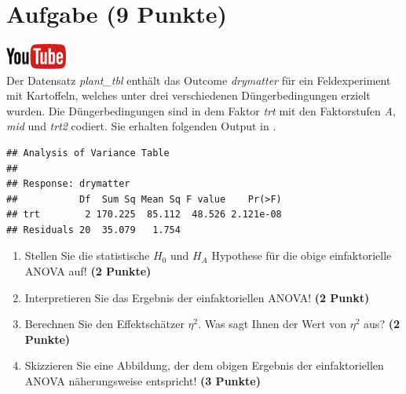 \documentclass[a4paper, 9pt]{scrartcl}\usepackage[]{graphicx}\usepackage[]{xcolor}
\makeatletter
\newenvironment{kframe}{%
 \def\at@end@of@kframe{}%
 \ifinner\ifhmode%
  \def\at@end@of@kframe{\end{minipage}}%
  \begin{minipage}{\columnwidth}%
 \fi\fi%
 \def\FrameCommand##1{\hskip\@totalleftmargin \hskip-\fboxsep
 \colorbox{shadecolor}{##1}\hskip-\fboxsep
     \hskip-\linewidth \hskip-\@totalleftmargin \hskip\columnwidth}%
 \MakeFramed {\advance\hsize-\width
   \@totalleftmargin\z@ \linewidth\hsize
   \@setminipage}}%
 {\par\unskip\endMakeFramed%
 \at@end@of@kframe}
\newenvironment{knitrout}{}{} %
\makeatother
\begin{document}
 
\clearpage

\section{Aufgabe \hfill (9 Punkte)}

\hfill\href{https://youtu.be/d4CFR2MKX7I}{\includegraphics[width =
  2cm]{img/youtube}}\\[1Ex]




Der Datensatz \textit{plant\_tbl} enth{\"a}lt das Outcome \textit{drymatter} f{\"u}r ein Feldexperiment mit 
Kartoffeln, welches unter drei 
verschiedenen D{\"u}ngerbedingungen erzielt wurden. Die D{\"u}ngerbedingungen sind in dem Faktor
\textit{trt} mit den Faktorstufen \textit{A},  \textit{mid} und
 \textit{trt2} codiert. Sie erhalten folgenden Output in \Rlogo.

\begin{knitrout}
\color{fgcolor}\begin{kframe}
\begin{verbatim}
## Analysis of Variance Table
## 
## Response: drymatter
##           Df  Sum Sq Mean Sq F value    Pr(>F)
## trt        2 170.225  85.112  48.526 2.121e-08
## Residuals 20  35.079   1.754
\end{verbatim}
\end{kframe}
\end{knitrout}

\begin{enumerate}
\item Stellen Sie die statistische $H_0$ und $H_A$ Hypothese f{\"u}r die obige
  einfaktorielle ANOVA auf! \textbf{(2 Punkte)}
\item Interpretieren Sie das Ergebnis der einfaktoriellen ANOVA! \textbf{(2 Punkt)} 
\item Berechnen Sie den Effektsch{\"a}tzer $\eta^2$. Was sagt Ihnen der Wert von
  $\eta^2$ aus? \textbf{(2 Punkte)}
\item Skizzieren Sie eine Abbildung, der dem obigen Ergebnis der
  einfaktoriellen ANOVA n{\"a}herungsweise entspricht! \textbf{(3 Punkte)}
\end{enumerate}
\end{document}
